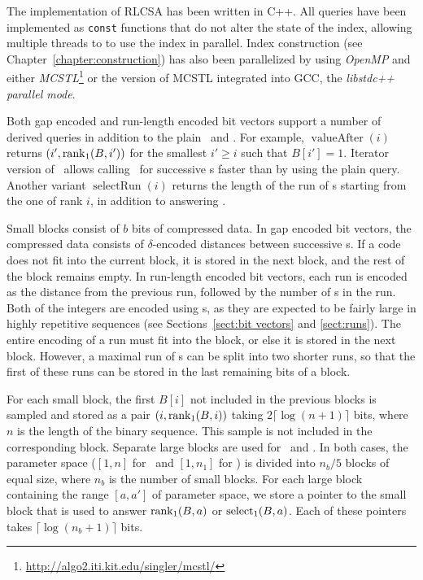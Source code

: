 The implementation of RLCSA has been written in C++. All queries have been implemented as \texttt{const} functions that do not alter the state of the index, allowing multiple threads to to use the index in parallel. Index construction (see Chapter~\ref{chapter:construction}) has also been parallelized by using \emph{OpenMP} and either \emph{MCSTL}\footnote{\url{http://algo2.iti.kit.edu/singler/mcstl/}} or the version of MCSTL integrated into GCC, the \emph{libstdc++ parallel mode}.

Both gap encoded and run-length encoded bit vectors support a number of derived queries in addition to the plain \rank\ and \select. For example, $\operatorname{valueAfter}(i)$ returns $(i', \operatorname{rank}_{1}(B, i'))$ for the smallest $i' \ge i$ such that $B[i'] = 1$. Iterator version of \select\ allows calling \select\ for successive \onebit{}s faster than by using the plain query. Another variant $\operatorname{selectRun}(i)$ returns the length of the run of \onebit{}s starting from the one of rank $i$, in addition to answering \select.

Small blocks consist of $b$ bits of compressed data. In gap encoded bit vectors, the compressed data consists of $\delta$\nobreakdash-encoded distances between successive \onebit{}s. If a code does not fit into the current block, it is stored in the next block, and the rest of the block remains empty. In run-length encoded bit vectors, each run is encoded as the distance from the previous run, followed by the number of \onebit{}s in the run. Both of the integers are encoded using \deltacode{}s, as they are expected to be fairly large in highly repetitive sequences (see Sections~\ref{sect:bit vectors} and \ref{sect:runs}). The entire encoding of a run must fit into the block, or else it is stored in the next block. However, a maximal run of \onebit{}s can be split into two shorter runs, so that the first of these runs can be stored in the last remaining bits of a block.

For each small block, the first \onebit{} $B[i]$ not included in the previous blocks is sampled and stored as a pair $(i, \operatorname{rank}_{1}(B, i))$ taking $2 \lceil \log (n+1) \rceil$ bits, where $n$ is the length of the binary sequence. This sample is not included in the corresponding block. Separate large blocks are used for \rank\ and \select. In both cases, the parameter space ($[1,n]$ for \rank\ and $[1,n_{1}]$ for \select) is divided into $n_{b} / 5$ blocks of equal size, where $n_{b}$ is the number of small blocks. For each large block containing the range $[a,a']$ of parameter space, we store a pointer to the small block that is used to answer $\operatorname{rank}_{1}(B,a)$ or $\operatorname{select}_{1}(B,a)$. Each of these pointers takes $\lceil \log (n_{b}+1) \rceil$ bits.

